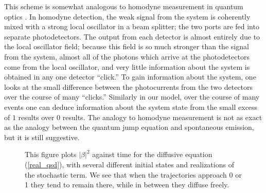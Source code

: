 \documentclass[12pt]{article}
\begin{document}
This scheme is somewhat analogous to homodyne measurement in quantum optics
\cite{Carmichael,Wiseman}.  In homodyne detection, the weak signal from the
system is coherently mixed with a strong local oscillator in a beam splitter;
the two ports are fed into separate photodetectors.  The output from each
detector is almost entirely due to the local oscillator field; because
this field is so much stronger than the signal from the system, almost
all of the photons which arrive at the photodetectors come from the local
oscillator, and very little information about the system is obtained
in any one detector ``click.''  To gain information about the system, one
looks at the small difference between the photocurrents from the two detectors
over the course of many ``clicks.''  Similarly in our model,
over the course of many events one can deduce information
about the system state from the small excess of $1$ results over $0$ results.
The analogy to homodyne measurement is not as exact as the analogy between
the quantum jump equation and spontaneous emission, but it is still
suggestive.

\begin{figure}[ht]
\begin{center}
\label{fig4}
\end{center}
\caption{This figure plots $|\beta|^2$ against time for the diffusive
equation (\ref{real_qsd}), with several different initial states and
realizations of the stochastic term.  We see that when the trajectories
approach 0 or 1 they tend to remain there, while in between they diffuse
freely.}
\end{figure}
\end{document}

